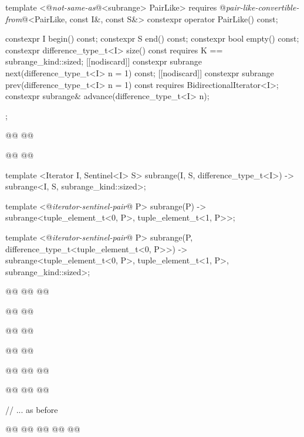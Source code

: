 \begin{codeblock}
{{{    template <@\textit{not-same-as}@<subrange> PairLike>
      requires @\textit{pair-like-convertible-from}@<PairLike, const I&, const S&>
    constexpr operator PairLike() const;

    constexpr I begin() const;
    constexpr S end() const;
    constexpr bool empty() const;
    constexpr difference_type_t<I> size() const
      requires K == subrange_kind::sized;
    [[nodiscard]] constexpr subrange next(difference_type_t<I> n = 1) const;
    [[nodiscard]] constexpr subrange prev(difference_type_t<I> n = 1) const
      requires BidirectionalIterator<I>;
    constexpr subrange& advance(difference_type_t<I> n);
  };

  @@
    @@

  @@
    @@

  template <Iterator I, Sentinel<I> S>
  subrange(I, S, difference_type_t<I>) -> subrange<I, S, subrange_kind::sized>;

  template <@\textit{iterator-sentinel-pair}@ P>
  subrange(P) ->
    subrange<tuple_element_t<0, P>, tuple_element_t<1, P>>;

  template <@\textit{iterator-sentinel-pair}@ P>
  subrange(P, difference_type_t<tuple_element_t<0, P>>) ->
    subrange<tuple_element_t<0, P>, tuple_element_t<1, P>, subrange_kind::sized>;

  @@
  @@
    @@

  @@
  @@

  @@
  @@

  @@
  @@

  @@
    @@
  @@

  @@
  @@
    @@

  // ... as before

  @@
    @@
      @@
        @@
        @@
}}
\end{codeblock}

